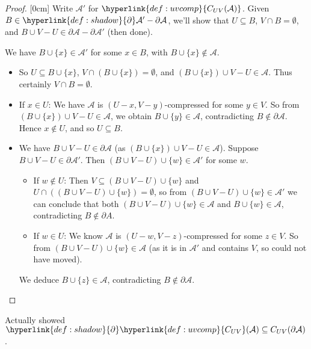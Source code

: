 \documentclass{article}
\newcommand{\A}{\mathcal{A}}
\let\subset\subseteq
\begin{document}
\begin{proof}
  [0cm]
  Write $\mathcal{A}'$ for $\hyperlink{def:uvcomp}{C_{UV}(\mathcal{A})}$.
  Given $B \in \hyperlink{def:shadow}{\partial} \A' - \partial \A$, we'll show that $U \subset B$, $V \cap B = \emptyset$, and $B \cup V - U \in \partial \A - \partial \A'$ (then done).

  We have $B \cup \{x\} \in \mathcal{A}'$ for some $x \in B$, with $B \cup \{x\} \notin \mathcal{A}$.
  \begin{itemize}
    \item So $U \subset B \cup \{x\}$, $V \cap (B \cup \{x\}) = \emptyset$, and $(B \cup \{x\}) \cup V - U \in \mathcal{A}$.
      Thus certainly $V \cap B = \emptyset$.

    \item If $x \in U$: We have $\mathcal{A}$ is $(U-x,V-y)$-compressed for some $y \in V$.
      So from $(B \cup \{x\}) \cup V - U \in \mathcal{A}$, we obtain $B \cup \{y\} \in \mathcal{A}$,
      contradicting $B \notin \partial \mathcal{A}$.
      Hence $x \notin U$, and so $U \subset B$.
    \item We have $B \cup V - U \in \partial \mathcal{A}$ (as $(B \cup \{x\}) \cup V - U \in \mathcal{A}$).
      Suppose $B \cup V - U \in \partial \mathcal{A}'$.
      Then $(B \cup V - U) \cup \{w\} \in \mathcal{A}'$ for some $w$.

      \begin{itemize}
        \item If $w \notin U$: Then $V \subset (B \cup V - U) \cup \{w\}$ and $U \cap ((B \cup V - U) \cup \{w\}) = \emptyset$, so from $(B \cup V - U) \cup \{w\} \in \mathcal{A}'$ we can conclude that both $(B \cup V - U) \cup \{w\} \in \mathcal{A}$ and $B \cup \{w\} \in \mathcal{A}$, contradicting $B \notin \partial A.$

        \item If $w \in U$: We know $\mathcal{A}$ is $(U-w,V-z)$-compressed for some $z \in V$.
          So from $(B \cup V - U) \cup \{w\} \in \mathcal{A}$ (as it is in $\mathcal{A}'$ and contains $V$, so could not have moved).
      \end{itemize}
      We deduce $B \cup \{z\} \in \mathcal{A}$, contradicting $B \notin \partial \mathcal{A}$. \qedhere
  \end{itemize}
\end{proof}
\begin{remark}
  Actually showed $\hyperlink{def:shadow}{\partial} \hyperlink{def:uvcomp}{C_{UV}}(\mathcal{A}) \subseteq C_{UV}(\partial\mathcal{A})$.
\end{remark}
\end{document}
